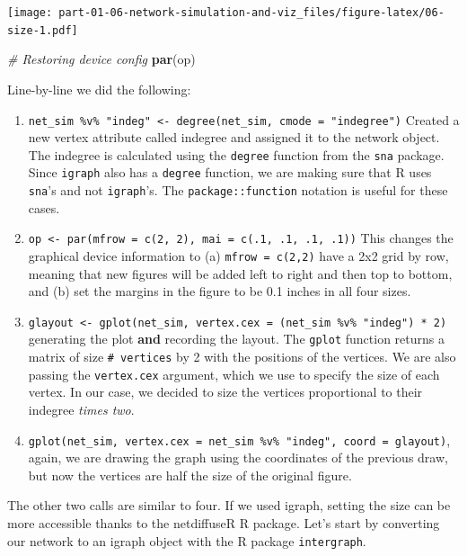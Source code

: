 \documentclass[]{book}
\newenvironment{Shaded}{\begin{snugshade}}{\end{snugshade}}
\newcommand{\CommentTok}[1]{\textcolor[rgb]{0.56,0.35,0.01}{\textit{#1}}}
\newcommand{\KeywordTok}[1]{\textcolor[rgb]{0.13,0.29,0.53}{\textbf{#1}}}
\newcommand{\NormalTok}[1]{#1}
\begin{document}
\texttt{[image: part-01-06-network-simulation-and-viz\_files/figure-latex/06-size-1.pdf]}

\begin{Shaded}
\begin{Highlighting}[]
\CommentTok{# Restoring device config}
\KeywordTok{par}\NormalTok{(op)}
\end{Highlighting}
\end{Shaded}

Line-by-line we did the following:

\begin{enumerate}
\def\labelenumi{\arabic{enumi}.}
\item
  \texttt{net\_sim\ \%v\%\ "indeg"\ \textless{}-\ degree(net\_sim,\ cmode\ =\ "indegree")} Created a new
  vertex attribute called indegree and assigned it to the network object.
  The indegree is calculated using the \texttt{degree} function from the \texttt{sna}
  package. Since \texttt{igraph} also has a \texttt{degree} function, we are making sure
  that R uses \texttt{sna}'s and not \texttt{igraph}'s. The \texttt{package::function} notation
  is useful for these cases.
\item
  \texttt{op\ \textless{}-\ par(mfrow\ =\ c(2,\ 2),\ mai\ =\ c(.1,\ .1,\ .1,\ .1))} This changes the
  graphical device information to (a) \texttt{mfrow\ =\ c(2,2)} have a 2x2 grid by row,
  meaning that new figures will be added left to right and then top to bottom,
  and (b) set the margins in the figure to be 0.1 inches in all four sizes.
\item
  \texttt{glayout\ \textless{}-\ gplot(net\_sim,\ vertex.cex\ =\ (net\_sim\ \%v\%\ "indeg")\ *\ 2)} generating
  the plot \textbf{and} recording the layout. The \texttt{gplot} function returns a matrix of
  size \texttt{\#\ vertices} by 2 with the positions of the vertices. We are also passing the
  \texttt{vertex.cex} argument, which we use to specify the size of each vertex. In our
  case, we decided to size the vertices proportional to their indegree \emph{times two}.
\item
  \texttt{gplot(net\_sim,\ vertex.cex\ =\ net\_sim\ \%v\%\ "indeg",\ coord\ =\ glayout)}, again,
  we are drawing the graph using the coordinates of the previous draw, but now
  the vertices are half the size of the original figure.
\end{enumerate}

The other two calls are similar to four. If we used igraph, setting the
size can be more accessible thanks to the netdiffuseR R package. Let's start by converting
our network to an igraph object with the R package \texttt{intergraph}.
\end{document}
